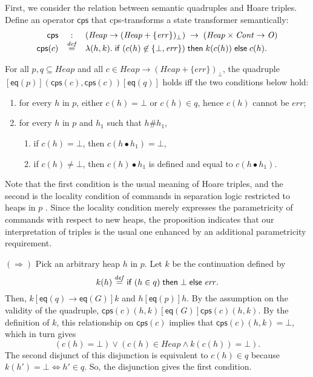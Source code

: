 \documentclass{LMCS}
\newcommand{\Heap}{\mathit{Heap}}
\newcommand{\Obs}{\mathit{O}}
\newcommand{\Good}{\mathit{G}}
\newcommand{\cont}{\mathit{Cont}}
\newcommand{\error}{\mathit{err}}
\newcommand{\key}[1]{{\sf #1}}
\newcommand{\ifthenElse}[3]{\key{if}\; #1 \;\key{then}\; #2 \;\key{else}\; #3}
\newcommand{\squad}[4]{{[{#1}]}
                        ({#2},  {#3})
                       {[{#4}]}}
\newcommand{\EQ}{\mathsf{eq}}
\newcommand{\defeq}{\stackrel{\mathit{def}}{=}}
\newcommand{\cps}{\mathsf{cps}}
\begin{document}
First, we consider the relation between semantic quadruples and
Hoare triples.
Define an operator $\cps$ that cps-transforms a state transformer
semantically: 
$$
\begin{array}{rcl}
   \cps & : &
   (\Heap \rightarrow (\Heap + \{\error\})_\bot) 
   \;\rightarrow\;
   (\Heap \times \cont \rightarrow \Obs)
\\
   \cps(c) & \defeq &
   \lambda (h,k).\;
   \ifthenElse
      {(c(h)\not\in \{\bot,\error\})}
      {k(c(h))}
      {c(h)}.
\end{array}
$$
\begin{prop}\label{prop:triple-quadruple}
For all $p,q \subseteq \Heap$ and all 
$c \in \Heap \rightarrow (\Heap + \{\error\})_\bot$,
the quadruple $\squad{\EQ(p)}{\cps(c)}{\cps(c)}{\EQ(q)}$ holds
iff the two conditions below hold:
\begin{enumerate}
\item for every $h$ in $p$,
         either $c(h) = \bot$ or $c(h) \in q$, hence
         $c(h)$ cannot be $\error$;
\item for every $h$ in $p$ and $h_1$ such that $h\# h_1$,
   \begin{enumerate}
   \item if $c(h) = \bot$, then $c(h\bullet h_1) = \bot$,
   \item if $c(h) \not=\bot$, then $c(h)\bullet h_1$ is defined and equal
         to $c(h\bullet h_1)$.
   \end{enumerate}
\end{enumerate}
\end{prop}
Note that the first condition is the usual meaning
of Hoare triples, and the second is the locality
condition of commands in separation logic restricted to 
heaps in $p$ \cite{reynolds02}. Since the locality condition merely
expresses the parametricity of commands with respect to new heaps, 
the proposition indicates that our interpretation of triples is the usual one
enhanced by an additional parametricity requirement.

$(\Rightarrow)$ Pick an arbitrary heap $h$ in $p$. Let $k$ be the
continuation defined by 
$$
   k(h) \defeq \ifthenElse{(h\in q)}{\bot}{\error}. 
$$
Then, $k[\EQ(q) \rightarrow \EQ(\Good)]k$ and $h[\EQ(p)]h$. By
the assumption on the validity of the quadruple,
$\cps(c)(h,k)[\EQ(\Good)]\cps(c)(h,k)$. By the definition of $k$,
this relationship on $\cps(c)$ implies that $\cps(c)(h,k) = \bot$,
which in turn gives 
$$
(c(h) = \bot) \vee (c(h) \in \Heap \wedge k(c(h)) = \bot).
$$ 
The second disjunct of this disjunction is equivalent to $c(h) \in q$
because $k(h') = \bot \iff h' \in q$. So, the
disjunction gives the first condition.
\end{document}

